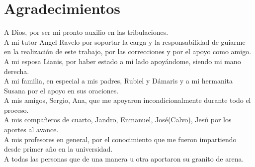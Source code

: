 \section*{Agradecimientos}

A Dios, por ser mi pronto auxilio en las tribulaciones.\\
A mi tutor Angel Ravelo por soportar la carga y la responsabilidad de guiarme en la realización de este trabajo, por las correcciones y por el apoyo como amigo.\\
A mi esposa Lianis, por haber estado a mi lado apoyándome, siendo mi mano derecha.\\
A mi familia, en especial a mis padres, Rubiel y Dámaris y a mi hermanita Susana por el apoyo en sus oraciones.\\
A mis amigos, Sergio, Ana, que me apoyaron incondicionalmente durante todo el proceso.\\
A mis compañeros de cuarto, Jandro, Enmanuel, José(Calvo), Jesú por los aportes al avance.\\
A mis profesores en general, por el conocimiento que me fueron impartiendo desde primer año en la universidad.\\
A todas las personas que de una manera u otra aportaron su granito de arena.\\